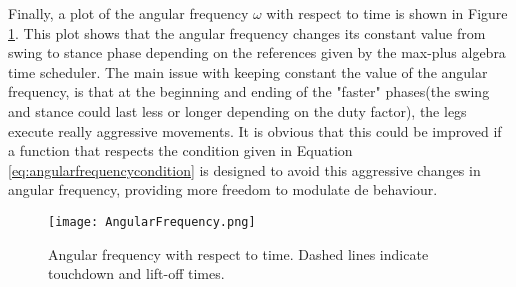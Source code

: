 \documentclass[main.tex]{subfiles}
\begin{document}
Finally, a plot of the angular frequency $\omega$ with respect to time is shown in Figure \ref{fig:AngularFrequency}. This plot shows that the angular frequency changes its constant value from swing to stance phase depending on the references given by the max-plus algebra time scheduler. The main issue with keeping constant the value of the angular frequency, is that at the beginning and ending of the "faster" phases(the swing and stance could last less or longer depending on the duty factor), the legs execute really aggressive movements. It is obvious that this could be improved if a function that respects the condition given in Equation \ref{eq:angularfrequencycondition} is designed to avoid this aggressive changes in angular frequency, providing more freedom to modulate de behaviour.
\begin{figure}[t]\centering
		\texttt{[image: AngularFrequency.png]}
		\caption{Angular frequency with respect to time. Dashed lines indicate touchdown and lift-off times.
			\label{fig:AngularFrequency} }
\end{figure}
\end{document}
